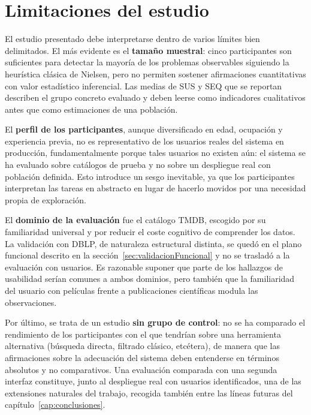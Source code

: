 \section{Limitaciones del estudio}
\label{sec:limitacionesEstudio}

El estudio presentado debe interpretarse dentro de varios límites bien delimitados. El más
evidente es el \textbf{tamaño muestral}: cinco participantes son suficientes para detectar la
mayoría de los problemas observables siguiendo la heurística clásica de Nielsen, pero no
permiten sostener afirmaciones cuantitativas con valor estadístico inferencial. Las medias
de SUS y SEQ que se reportan describen el grupo concreto evaluado y deben leerse como
indicadores cualitativos antes que como estimaciones de una población.

El \textbf{perfil de los participantes}, aunque diversificado en edad, ocupación y experiencia
previa, no es representativo de los usuarios reales del sistema en producción, fundamentalmente
porque tales usuarios no existen aún: el sistema se ha evaluado sobre catálogos de prueba y
no sobre un despliegue real con población definida. Esto introduce un sesgo inevitable, ya
que los participantes interpretan las tareas en abstracto en lugar de hacerlo movidos por
una necesidad propia de exploración.

El \textbf{dominio de la evaluación} fue el catálogo TMDB, escogido por su familiaridad
universal y por reducir el coste cognitivo de comprender los datos. La validación con DBLP,
de naturaleza estructural distinta, se quedó en el plano funcional descrito en la
sección~\ref{sec:validacionFuncional} y no se trasladó a la evaluación con usuarios. Es
razonable suponer que parte de los hallazgos de usabilidad serían comunes a ambos dominios,
pero también que la familiaridad del usuario con películas frente a publicaciones científicas
modula las observaciones.

Por último, se trata de un estudio \textbf{sin grupo de control}: no se ha comparado el
rendimiento de los participantes con el que tendrían sobre una herramienta alternativa
(búsqueda directa, filtrado clásico, etcétera), de manera que las afirmaciones sobre la
adecuación del sistema deben entenderse en términos absolutos y no comparativos. Una
evaluación comparada con una segunda interfaz constituye, junto al despliegue real con
usuarios identificados, una de las extensiones naturales del trabajo, recogida también
entre las líneas futuras del capítulo~\ref{cap:conclusiones}.
